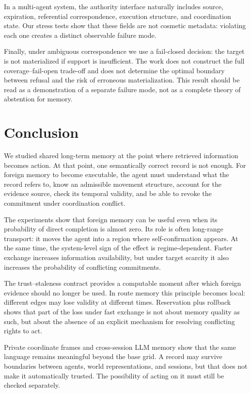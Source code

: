 \documentclass{article}
\begin{document}
In a multi-agent system, the authority interface naturally includes source, expiration, referential correspondence, execution structure, and coordination state. Our stress tests show that these fields are not cosmetic metadata: violating each one creates a distinct observable failure mode.

Finally, under ambiguous correspondence we use a fail-closed decision: the target is not materialized if support is insufficient. The work does not construct the full coverage--fail-open trade-off and does not determine the optimal boundary between refusal and the risk of erroneous materialization. This result should be read as a demonstration of a separate failure mode, not as a complete theory of abstention for memory.

\section{Conclusion}

We studied shared long-term memory at the point where retrieved information becomes action. At that point, one semantically correct record is not enough. For foreign memory to become executable, the agent must understand what the record refers to, know an admissible movement structure, account for the evidence source, check its temporal validity, and be able to revoke the commitment under coordination conflict.

The experiments show that foreign memory can be useful even when its probability of direct completion is almost zero. Its role is often long-range transport: it moves the agent into a region where self-confirmation appears. At the same time, the system-level sign of the effect is regime-dependent. Faster exchange increases information availability, but under target scarcity it also increases the probability of conflicting commitments.

The trust--staleness contract provides a computable moment after which foreign evidence should no longer be used. In route memory this principle becomes local: different edges may lose validity at different times. Reservation plus rollback shows that part of the loss under fast exchange is not about memory quality as such, but about the absence of an explicit mechanism for resolving conflicting rights to act.

Private coordinate frames and cross-session LLM memory show that the same language remains meaningful beyond the base grid. A record may survive boundaries between agents, world representations, and sessions, but that does not make it automatically trusted. The possibility of acting on it must still be checked separately.
\end{document}

